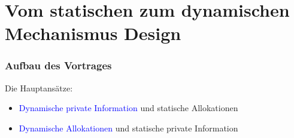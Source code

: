 \section{Vom statischen zum dynamischen Mechanismus Design}

\begin{frame}
\frametitle{Aufbau des Vortrages}
\justifying
Die Hauptans\"atze:
\begin{itemize}
    \item \textcolor{blue}{Dynamische private Information} und statische Allokationen
    \item \textcolor{blue}{Dynamische Allokationen} und statische private Information
\end{itemize}

\end{frame}

